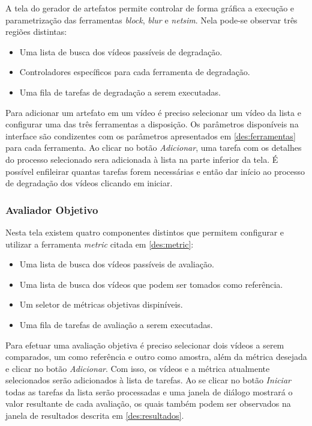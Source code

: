 A tela do gerador de artefatos permite controlar de forma gráfica a execução e parametrização das ferramentas \emph{block}, \emph{blur} e \emph{netsim}. Nela pode-se observar três regiões distintas:

\begin{itemize}
	\item Uma lista de busca dos vídeos passíveis de degradação.
	\item Controladores específicos para cada ferramenta de degradação.
	\item Uma fila de tarefas de degradação a serem executadas.
\end{itemize}

Para adicionar um artefato em um vídeo é preciso selecionar um vídeo da lista e configurar uma das três ferramentas a disposição. 
Os parâmetros disponíveis na interface são condizentes com os parâmetros apresentados em \ref{des:ferramentas} para cada ferramenta.
Ao clicar no botão \emph{Adicionar}, uma tarefa com os detalhes do processo selecionado sera adicionada à lista na parte inferior da tela. É possível enfileirar quantas tarefas forem necessárias e então dar início ao processo de degradação dos vídeos clicando em iniciar.

\subsubsection{Avaliador Objetivo}

Nesta tela existem quatro componentes distintos que permitem configurar e utilizar a ferramenta \emph{metric} citada em \ref{des:metric}:

\begin{itemize}
	\item Uma lista de busca dos vídeos passíveis de avaliação.
	\item Uma lista de busca dos vídeos que podem ser tomados como referência.
	\item Um seletor de métricas objetivas dispiníveis.
	\item Uma fila de tarefas de avaliação a serem executadas.
\end{itemize}

Para efetuar uma avaliação objetiva é preciso selecionar dois vídeos a serem comparados, um como referência e outro como amostra, além da métrica desejada e clicar no botão \emph{Adicionar}.
Com isso, os vídeos e a métrica atualmente selecionados serão adicionados à lista de tarefas. 
Ao se clicar no botão \emph{Iniciar} todas as tarefas da lista serão processadas e uma janela de diálogo mostrará o valor resultante de cada avaliação, os quais também podem ser observados na janela de resultados descrita em \ref{des:resultados}.

